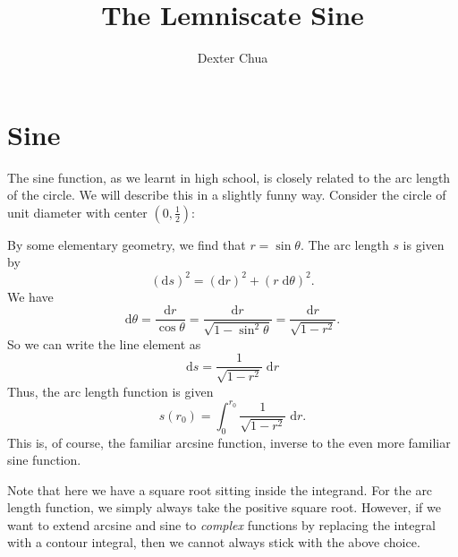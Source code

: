 \documentclass{shortart}
\title{The Lemniscate Sine}
\author{Dexter Chua}
\theoremstyle{definition}
\renewcommand\d{\mathrm{d}}
\begin{document}

\section{Sine}
The sine function, as we learnt in high school, is closely related to the arc length of the circle. We will describe this in a slightly funny way. Consider the circle of unit diameter with center $(0, \frac{1}{2})$:
\begin{center}
\end{center}
By some elementary geometry, we find that $r = \sin \theta$. The arc length $s$ is given by
\[
  (\d s)^2 = (\d r)^2 + (r \;\d \theta)^2.
\]
We have
\[
  \d \theta = \frac{\d r}{\cos \theta} = \frac{\d r}{\sqrt{1 - \sin^2 \theta}} = \frac{\d r}{\sqrt{1 - r^2}}.
\]
So we can write the line element as
\[
  \d s = \frac{1}{\sqrt{1 - r^2}}\;\d r
\]
Thus, the arc length function is given
\[
  s(r_0) = \int_0^{r_0} \frac{1}{\sqrt{1 - r^2}}\;\d r.
\]
This is, of course, the familiar arcsine function, inverse to the even more familiar sine function.

Note that here we have a square root sitting inside the integrand. For the arc length function, we simply always take the positive square root. However, if we want to extend arcsine and sine to \emph{complex} functions by replacing the integral with a contour integral, then we cannot always stick with the above choice.
\end{document}
